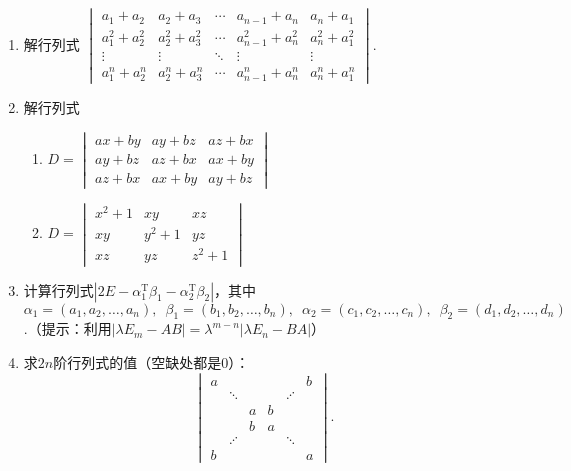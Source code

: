 \begin{enumerate}
    \item 解行列式 $\begin{vmatrix}
        a_{1}+a_{2}         & a_{2}+a_{3}         & \cdots & a_{n-1}+a_n         & a_n+a_{1}         \\
        a_{1}^{2}+a_{2}^{2} & a_{2}^{2}+a_{3}^{2} & \cdots & a_{n-1}^{2}+a_n^{2} & a_n^{2}+a_{1}^{2} \\
        \vdots              & \vdots              & \ddots & \vdots              & \vdots            \\
        a_{1}^{n}+a_{2}^{n} & a_{2}^{n}+a_{3}^{n} & \cdots & a_{n-1}^{n}+a_n^{n} & a_n^{n}+a_{1}^{n}
    \end{vmatrix}$.

    \item 解行列式
          \begin{multicols}{2} \begin{enumerate}
                  \item $D=\begin{vmatrix}
                                ax+by & ay+bz & az+bx \\
                                ay+bz & az+bx & ax+by \\
                                az+bx & ax+by & ay+bz
                            \end{vmatrix}$

                  \item $D=\begin{vmatrix}
                                x^2+1 & xy    & xz    \\
                                xy    & y^2+1 & yz    \\
                                xz    & yz    & z^2+1
                            \end{vmatrix}$
              \end{enumerate} \end{multicols}

    \item 计算行列式$|2E-\alpha_1^\mathrm{T}\beta_1-\alpha_2^\mathrm{T}\beta_2|$，其中$\alpha_1=(a_1,a_2,\ldots,a_n),\enspace \beta_1=(b_1,b_2,\ldots,b_n),\enspace \alpha_2=(c_1,c_2,\ldots,c_n),\enspace \beta_2 = (d_1,d_2,\ldots,d_n)$.（提示：利用$|\lambda E_m-AB|=\lambda^{m-n}|\lambda E_n-BA|$）

    \item 求$2n$阶行列式的值（空缺处都是0）：
          \[\begin{vmatrix}
                  a &         &   &   &         & b \\
                    & \ddots  &   &   & \iddots &   \\
                    &         & a & b &         &   \\
                    &         & b & a &         &   \\
                    & \iddots &   &   & \ddots  &   \\
                  b &         &   &   &         & a
              \end{vmatrix}.\]
\end{enumerate}

